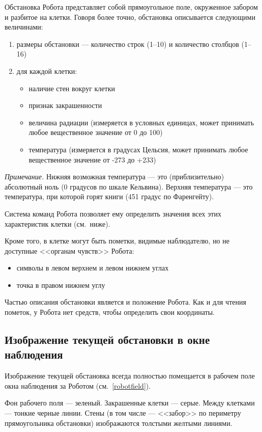 Обстановка Робота представляет собой прямоугольное поле, окруженное забором и разбитое на клетки. Говоря более точно, обстановка описывается следующими величинами:
\begin{enumerate}
\item размеры обстановки --- количество строк (1--10) и количество столбцов (1--16)
\item для каждой клетки:
\begin{itemize}
\item наличие стен вокруг клетки
\item признак закрашенности
\item величина радиации (измеряется в условных единицах, может принимать любое вещественное значение от 0 до 100)
\item температура (измеряется в градусах Цельсия, может принимать любое вещественное значение от -273 до +233)
\end{itemize}
\end{enumerate}

\emph{Примечание.} Нижняя возможная температура --- это (приблизительно) абсолютный ноль (0 градусов по шкале Кельвина). Верхняя температура --- это температура, при которой горят книги (451 градус по Фаренгейту).	

Система команд Робота позволяет ему определить значения всех этих характеристик клетки (см.~ниже).

Кроме того, в клетке могут быть пометки, видимые  наблюдателю, но не доступные <<органам чувств>> Робота:
\begin{itemize}
\item символы в левом верхнем и левом нижнем углах
\item точка в правом нижнем углу
\end{itemize}

Частью описания обстановки является и положение Робота. Как и для чтения пометок, у Робота нет средств, чтобы определить свои координаты.

\subsection{Изображение текущей обстановки в окне наблюдения}

Изображение текущей обстановка всегда полностью помещается в рабочем поле окна наблюдения за Роботом (см.~\ref{robotfield}).

Фон рабочего поля --- зеленый. Закрашенные клетки --- серые. Между клетками --- тонкие черные линии. Стены (в том числе --- <<забор>> по периметру прямоугольника обстановки) изображаются толстыми желтыми линиями.

